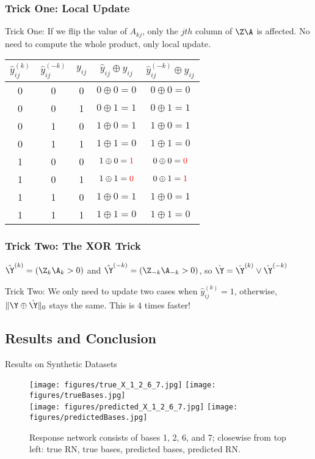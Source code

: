 \documentclass{beamer}
\begin{document}
\begin{frame}
\frametitle{Trick One: Local Update}
Trick One: If we flip the value of $A_{kj}$, only the $jth$ column of $\Z\A$ is affected. No need to compute the whole product, only local update.

\end{frame}

\begin{frame}
\begin{center}
  \begin{tabular}{ c | c | c || c | c}
    \hline
    $\hat y^{(k)}_{ij}$ & $\hat y^{(-k)}_{ij}$ & $y_{ij}$ & $\hat y_{ij} \oplus y_{ij}$ & $\hat y^{(-k)}_{ij} \oplus y_{ij}$ \\ \hline
    0 & 0 & 0 & $0 \oplus 0 = 0$ & $0 \oplus 0 = 0$ \\ \hline
    0 & 0 & 1 & $0 \oplus 1 = 1$ & $0 \oplus 1 = 1$ \\ \hline
    0 & 1 & 0 & $1 \oplus 0 = 1$ & $1 \oplus 0 = 1$ \\ \hline
    0 & 1 & 1 & $1 \oplus 1 = 0$ & $1 \oplus 1 = 0$ \\ \hline
    1 & 0 & 0 & $1 \oplus 0 = \color{red}{1}$ & $0 \oplus 0 = \color{red}{0}$ \\ \hline
    1 & 0 & 1 & $1 \oplus 1 = \color{red}{0}$ & $0 \oplus 1 = \color{red}{1}$ \\ \hline
    1 & 1 & 0 & $1 \oplus 0 = 1$ & $1 \oplus 0 = 1$ \\ \hline
    1 & 1 & 1 & $1 \oplus 1 = 0$ & $1 \oplus 1 = 0$ \\ \hline
  \end{tabular}
\end{center}

\fontsize{8pt}{7.2}\selectfont
\frametitle{Trick Two: The XOR Trick}
$\hat\Y^{(k)} = (\Z_k \A_k > 0)$ and $\hat\Y^{(-k)} = (\Z_{-k} \A_{-k} > 0)$, so $\hat\Y = \hat\Y^{(k)} \vee \hat\Y^{(-k)}$

Trick Two: We only need to update two cases when $\hat y^{(k)}_{ij} = 1$, otherwise, $\|\Y \oplus \hat\Y\|_0$ stays the same. This is $4$ times faster!

\end{frame}


\subsection{Results and Conclusion}
\begin{frame}
Results on Synthetic Datasets
\begin{figure}
  \centering
  \texttt{[image: figures/true\_X\_1\_2\_6\_7.jpg]}
  \texttt{[image: figures/trueBases.jpg]}\\
  \texttt{[image: figures/predicted\_X\_1\_2\_6\_7.jpg]}
  \texttt{[image: figures/predictedBases.jpg]}
  \caption{Response network consists of bases 1, 2, 6, and 7; closewise from top left: true RN, true bases, predicted bases, predicted RN.}
\end{figure}

\end{frame}
\end{document}
